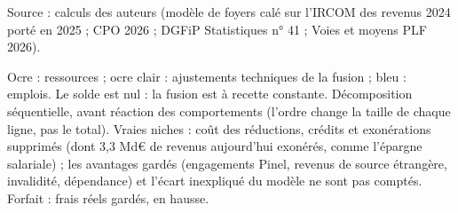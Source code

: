 Source : calculs des auteurs (modèle de foyers calé sur l'IRCOM des revenus 2024 porté en 2025 ; CPO 2026 ; DGFiP Statistiques n° 41 ; Voies et moyens PLF 2026).\par Ocre : ressources ; ocre clair : ajustements techniques de la fusion ; bleu : emplois. Le solde est nul : la fusion est à recette constante. Décomposition séquentielle, avant réaction des comportements (l'ordre change la taille de chaque ligne, pas le total). Vraies niches : coût des réductions, crédits et exonérations supprimés (dont 3,3 Md€ de revenus aujourd'hui exonérés, comme l'épargne salariale) ; les avantages gardés (engagements Pinel, revenus de source étrangère, invalidité, dépendance) et l'écart inexpliqué du modèle ne sont pas comptés. Forfait : frais réels gardés, en hausse.
